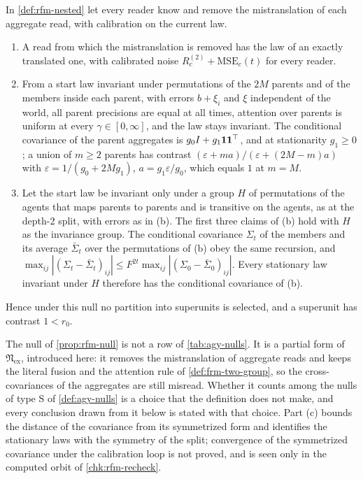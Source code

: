 \begin{proposition}\label{prop:rfm-null}
In \cref{def:rfm-nested} let every reader know and remove the mistranslation of each aggregate read, with calibration on the current law.
\begin{enumerate}
\item[(a)] A read from which the mistranslation is removed has the law of an exactly translated one, with calibrated noise $R_c^{(2)}+\mathrm{MSE}_c(t)$ for every reader.
\item[(b)] From a start law invariant under permutations of the $2M$ parents and of the members inside each parent, with errors $b+\xi_i$ and $\xi$ independent of the world, all parent precisions are equal at all times, attention over parents is uniform at every $\gamma\in[0,\infty]$, and the law stays invariant. The conditional covariance of the parent aggregates is $g_0I+g_1\mathbf{1}\mathbf{1}^\top$, and at stationarity $g_1\ge0$; a union of $m\ge2$ parents has contrast $(\varepsilon+ma)/(\varepsilon+(2M-m)a)$ with $\varepsilon=1/(g_0+2Mg_1)$, $a=g_1\varepsilon/g_0$, which equals $1$ at $m=M$.
\item[(c)] Let the start law be invariant only under a group $H$ of permutations of the agents that maps parents to parents and is transitive on the agents, as at the depth-2 split, with errors as in (b). The first three claims of (b) hold with $H$ as the invariance group. The conditional covariance $\Sigma_t$ of the members and its average $\bar\Sigma_t$ over the permutations of (b) obey the same recursion, and $\max_{ij}|(\Sigma_t-\bar\Sigma_t)_{ij}|\le F^{2t}\max_{ij}|(\Sigma_0-\bar\Sigma_0)_{ij}|$. Every stationary law invariant under $H$ therefore has the conditional covariance of (b).
\end{enumerate}
Hence under this null no partition into superunits is selected, and a superunit has contrast $1<r_0$.
\end{proposition}

The null of \cref{prop:rfm-null} is not a row of \cref{tab:agy-nulls}. It is a partial form of $\mathfrak N_{\mathrm{ex}}$, introduced here: it removes the mistranslation of aggregate reads and keeps the literal fusion and the attention rule of \cref{def:frm-two-group}, so the cross-covariances of the aggregates are still misread. Whether it counts among the nulls of type S of \cref{def:agy-nulls} is a choice that the definition does not make, and every conclusion drawn from it below is stated with that choice. Part (c) bounds the distance of the covariance from its symmetrized form and identifies the stationary laws with the symmetry of the split; convergence of the symmetrized covariance under the calibration loop is not proved, and is seen only in the computed orbit of \cref{chk:rfm-recheck}.

